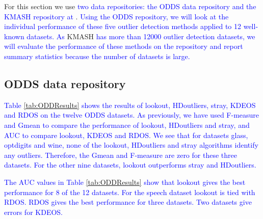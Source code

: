\documentclass[12pt]{article}
\theoremstyle{definition}
\theoremstyle{definition}
\theoremstyle{definition}
\theoremstyle{definition}
\theoremstyle{remark}
\begin{document}
For this section we use \textcolor{blue}{two data repositories: the ODDS data repository} \citep{datasetsODDS} \textcolor{blue}{and the KMASH repository at} \citet{datasets}. \textcolor{blue}{Using the ODDS repository, we will look at the individual performance of these five outlier detection methods applied to 12 well-known datasets. As} KMASH \textcolor{blue}{has more than 12000 outlier detection datasets, we will evaluate the performance of these methods on the repository and report summary statistics because the number of datasets is large.}

\hypertarget{odds-data-repository}{%
\subsection{ODDS data repository}\label{odds-data-repository}}

\textcolor{blue}{Table \ref{tab:ODDResults} shows the results of lookout, HDoutliers, stray, KDEOS and RDOS on the twelve ODDS datasets. As previously, we have used F-measure and Gmean to compare the performance of lookout,  HDoutliers and stray, and AUC to compare lookout, KDEOS and RDOS. We see that for datasets glass, optdigits and wine, none of the lookout, HDoutliers and stray algorithms identify any outliers. Therefore, the Gmean and F-measure are zero for these three datasets. For the other nine datasets, lookout outperforms stray and HDoutliers.}

\textcolor{blue}{The AUC values in Table \ref{tab:ODDResults} show that lookout gives the best performance for 8 of the 12 datasets. For the speech dataset lookout is tied with RDOS. RDOS gives the best performance for three datasets. Two datasets give errors for KDEOS.
}
\end{document}

